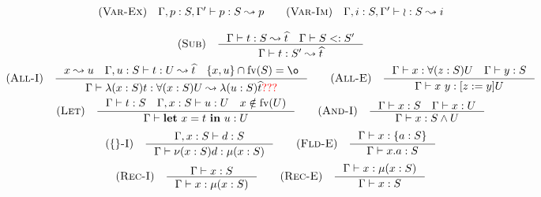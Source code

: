 \[\begin{array}{c}
    \RULE{Var-Ex} \quad \TJ{\Gamma, p: S, \Gamma'}{p}{S}{p} \qquad

    \RULE{Var-Im} \quad \TJ{\Gamma, i: S, \Gamma'}{\IMP}{S}{i} \\[4mm]

    \RULE{Sub} \quad \inference{
        \TJ{\Gamma}{t}{S}{\HAT{t}} \quad
        \SJT{\Gamma}{S}{S'}
    }{
        \TJ{\Gamma}{t}{S'}{\HAT{t}}
    } \\[4mm]

    \RULE{All-I} \quad \inference{
        x \leadsto u \quad
        \TJ{\Gamma, u: S}{t}{U}{\HAT{t}} \quad
        \{x, u\} \cap \FV{S} = \o
    }{
        \TJ{\Gamma}{\ABS{x}{S}{t}}{\DFUN{x}{S}{U}}{\ABS{u}{S}{\HAT{t}}}\RED{???}
    } \qquad

    \RULE{All-E} \quad \inference{
        \TJT{\Gamma}{x}{\DFUN{z}{S}{U}} \quad
        \TJT{\Gamma}{y}{S}
    }{
        \TJT{\Gamma}{x\ y}{\SUB{z}{y}U}
    } \\[4mm]

    \RULE{Let} \quad \inference{
        \TJT{\Gamma}{t}{S} \quad
        \TJT{\Gamma, x: S}{u}{U} \quad
        x \notin \FV{U}
    }{
        \TJT{\Gamma}{\LET{x}{t}{u}}{U}
    } \qquad

    \RULE{And-I} \quad \inference{
        \TJT{\Gamma}{x}{S} \quad
        \TJT{\Gamma}{x}{U}
    }{
        \TJT{\Gamma}{x}{\AGG{S}{U}}
    } \\[4mm]

    \RULE{\{\}-I} \quad \inference{
        \TJT{\Gamma, x: S}{d}{S}
    }{
        \TJT{\Gamma}{\OBJ{x}{S}{d}}{\REC{x}{S}}
    } \qquad

    \RULE{Fld-E} \quad \inference{
        \TJT{\Gamma}{x}{\FDEC{a}{S}}
    }{
        \TJT{\Gamma}{x.a}{S}
    } \\[4mm]

    \RULE{Rec-I} \quad \inference{
        \TJT{\Gamma}{x}{S}
    }{
        \TJT{\Gamma}{x}{\REC{x}{S}}
    } \qquad

    \RULE{Rec-E} \quad \inference{
        \TJT{\Gamma}{x}{\REC{x}{S}}
    }{
        \TJT{\Gamma}{x}{S}
    }
\end{array}\]
